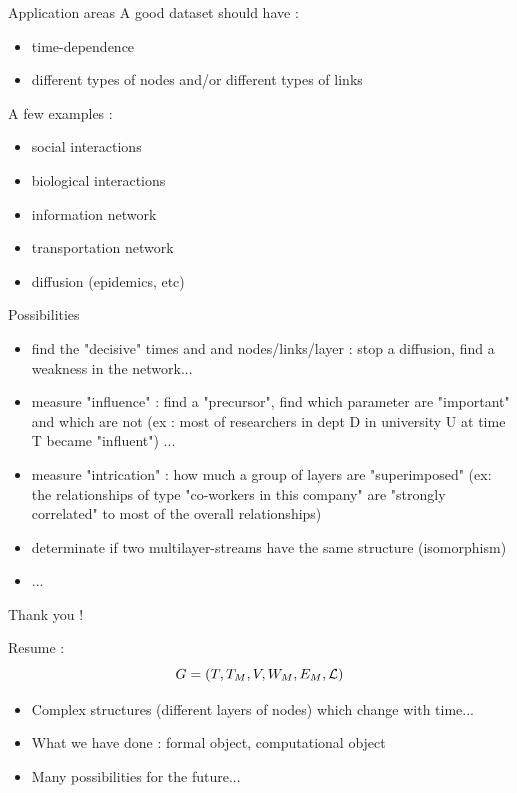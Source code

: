 \documentclass[15pt]{beamer}
\begin{document}
\begin{frame}{Application areas}
A good dataset should have :
\begin{itemize}
    \item time-dependence
    \item different types of nodes and/or different types of links
\end{itemize}
A few examples :
\begin{itemize}
    \item social interactions
    \item biological interactions
    \item information network
    \item transportation network
    \item diffusion (epidemics, etc)
\end{itemize}
\end{frame}
\begin{frame}{Possibilities}
 
\begin{itemize}
\pause
    \item find the "decisive" times and and nodes/links/layer : stop a diffusion, find a weakness in the network...
    \pause
    \item measure "influence" : find a "precursor", find which parameter are "important" and which are not (ex : most of researchers in dept D in university U at time T became "influent") ...\pause
    \item measure "intrication" : how much a group of layers are "superimposed" (ex: the relationships of type "co-workers in this company" are "strongly correlated" to most of the overall relationships)\pause
    \item determinate if two multilayer-streams have the same structure (isomorphism)
    \pause
    \item ...
\end{itemize}
    
\end{frame}

\begin{frame}{Thank you !}

Resume :
\[
G=(T,T_M,V,W_M,E_M,\cal{L})
\]
\begin{itemize}
	\item Complex structures (different layers of nodes) which change with time...
	\item What we have done : formal object, computational object 
	\item Many possibilities for the future...
\end{itemize}



\end{frame}
\end{document}
